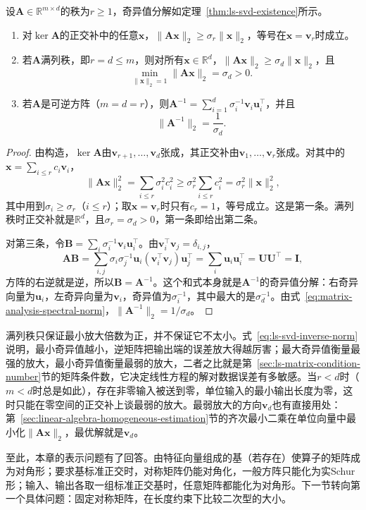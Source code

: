\begin{theorem}[最小奇异值与逆矩阵的范数]
\label{thm:ls-svd-singular-value-norms}
设$\bm A\in\mathbb R^{m\times d}$的秩为$r\geq1$，奇异值分解如定理~\ref{thm:ls-svd-existence}所示。
\begin{enumerate}
 \item 对$\ker\bm A$的正交补中的任意$\bm x$，$\lVert\bm A\bm x\rVert_2\geq\sigma_r\lVert\bm x\rVert_2$，等号在$\bm x=\bm v_r$时成立。
 \item 若$\bm A$满列秩，即$r=d\leq m$，则对所有$\bm x\in\mathbb R^d$，$\lVert\bm A\bm x\rVert_2\geq\sigma_d\lVert\bm x\rVert_2$，且
 \[
  \min_{\lVert\bm x\rVert_2=1}\lVert\bm A\bm x\rVert_2=\sigma_d>0 .
 \]
 \item 若$\bm A$是可逆方阵（$m=d=r$），则$\bm A^{-1}=\sum_{i=1}^d\sigma_i^{-1}\bm v_i\bm u_i^\top$，并且
 \begin{equation}
  \lVert\bm A^{-1}\rVert_2=\frac1{\sigma_d}.
  \label{eq:ls-svd-inverse-norm}
 \end{equation}
\end{enumerate}
\end{theorem}
\begin{proof}
由构造，$\ker\bm A$由$\bm v_{r+1},\ldots,\bm v_d$张成，其正交补由$\bm v_1,\ldots,\bm v_r$张成。对其中的$\bm x=\sum_{i\leq r}c_i\bm v_i$，
\[
 \lVert\bm A\bm x\rVert_2^2=\sum_{i\leq r}\sigma_i^2c_i^2\geq\sigma_r^2\sum_{i\leq r}c_i^2=\sigma_r^2\lVert\bm x\rVert_2^2 ,
\]
其中用到$\sigma_i\geq\sigma_r$（$i\leq r$）；取$\bm x=\bm v_r$时只有$c_r=1$，等号成立。这是第一条。满列秩时正交补就是$\mathbb R^d$，且$\sigma_r=\sigma_d>0$，第一条即给出第二条。

对第三条，令$\bm B=\sum_i\sigma_i^{-1}\bm v_i\bm u_i^\top$。由$\bm v_i^\top\bm v_j=\delta_{i,j}$，
\[
 \bm A\bm B=\sum_{i,j}\sigma_i\sigma_j^{-1}\bm u_i(\bm v_i^\top\bm v_j)\bm u_j^\top=\sum_i\bm u_i\bm u_i^\top=\bm U\bm U^\top=\bm I,
\]
方阵的右逆就是逆，所以$\bm B=\bm A^{-1}$。这个和式本身就是$\bm A^{-1}$的奇异值分解：右奇异向量为$\bm u_i$，左奇异向量为$\bm v_i$，奇异值为$\sigma_i^{-1}$，其中最大的是$\sigma_d^{-1}$。由式~\eqref{eq:matrix-analysis-spectral-norm}，$\lVert\bm A^{-1}\rVert_2=1/\sigma_d$。
\end{proof}

满列秩只保证最小放大倍数为正，并不保证它不太小。式~\eqref{eq:ls-svd-inverse-norm}说明，最小奇异值越小，逆矩阵把输出端的误差放大得越厉害；最大奇异值衡量最强的放大，最小奇异值衡量最弱的放大，二者之比就是第~\ref{sec:ls-matrix-condition-number}节的矩阵条件数，它决定线性方程的解对数据误差有多敏感。当$r<d$时（$m<d$时总是如此），存在非零输入被送到零，单位输入的最小输出长度为零，这时只能在零空间的正交补上谈最弱的放大。最弱放大的方向$\bm v_d$也有直接用处：第~\ref{sec:linear-algebra-homogeneous-estimation}节的齐次最小二乘在单位向量中最小化$\lVert\bm A\bm x\rVert_2$，最优解就是$\bm v_d$。

至此，本章的表示问题有了回答。由特征向量组成的基（若存在）使算子的矩阵成为对角形；要求基标准正交时，对称矩阵仍能对角化，一般方阵只能化为实Schur形；输入、输出各取一组标准正交基时，任意矩阵都能化为对角形。下一节转向第一个具体问题：固定对称矩阵，在长度约束下比较二次型的大小。
